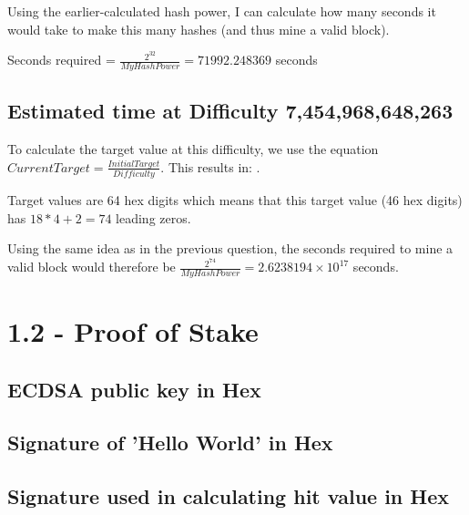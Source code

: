 \documentclass[11pt]{article}
\begin{document}
	Using the earlier-calculated hash power, I can calculate how many seconds it would take to make this many hashes (and thus mine a valid block). \newline
	
	Seconds required = $\frac{2^{32}}{My Hash Power} = 71992.248369$ seconds \newpage
	
	\subsection*{Estimated time at Difficulty 7,454,968,648,263}
	To calculate the target value at this difficulty, we use the equation $Current Target = \frac{Initial Target}{Difficulty}$. This results in: . \newline
	
	Target values are 64 hex digits which means that this target value (46 hex digits) has $18*4+2=74$ leading zeros. \newline
	
	Using the same idea as in the previous question, the seconds required to mine a valid block would therefore be $\frac{2^{74}}{My Hash Power} = 2.6238194 \times 10^{17}$ seconds.
	
	
	\newpage
	
	
	\section*{1.2 - Proof of Stake}
	\subsection*{ECDSA public key in Hex}
	
	\subsection*{Signature of 'Hello World' in Hex}
	
	\subsection*{Signature used in calculating hit value in Hex}
	
\end{document}
